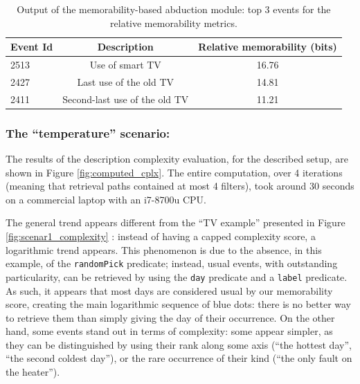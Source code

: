 \documentclass[entropy,article,submit,moreauthors,pdftex]{Definitions/mdpi}
\begin{document}

\begin{table}
    \centering
    \begin{tabular}{l|c|c}
        Event Id & Description                   & Relative memorability (bits) \\
        \hline
        2513     & Use of smart TV               & 16.76                        \\
        2427     & Last use of the old TV        & 14.81                        \\
        2411     & Second-last use of the old TV & 11.21
    \end{tabular}
    \caption{Output of the memorability-based abduction module: top 3 events for the relative memorability metrics.}
    \label{tab:abduction_res}
\end{table}

\subsubsection{The ``temperature'' scenario:}

The results of the description complexity evaluation, for the described setup,
are shown in Figure \ref{fig:computed_cplx}. The entire computation, over 4
iterations (meaning that retrieval paths contained at most 4 filters), took
around 30 seconds on a commercial laptop with an i7-8700u CPU.

The general trend appears different from the ``TV example'' presented in Figure \ref{fig:scenar1_complexity} : instead of having a capped complexity score, a logarithmic trend appears. This phenomenon is due to the absence, in this example, of the \texttt{randomPick} predicate; instead, usual events, with outstanding particularity, can be retrieved by using the \texttt{day} predicate and a \texttt{label} predicate. As such, it appears that most days are considered usual by our memorability score, creating the main logarithmic sequence of blue dots: there is no better way to retrieve them than simply giving the day of their occurrence. On the other hand, some events stand out in terms of
complexity: some appear simpler, as they can be distinguished by using their
rank along some axis (``the hottest day'', ``the second coldest day''), or the rare occurrence of their kind (``the only fault on the heater'').
\end{document}
